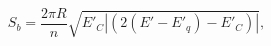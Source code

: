\begin{equation}
S_{b}=\frac{2\pi
R}{n}\sqrt{E'_{C}|(2(E'-E'_q)-E'_C)|},\label{careq2}
\end{equation}

